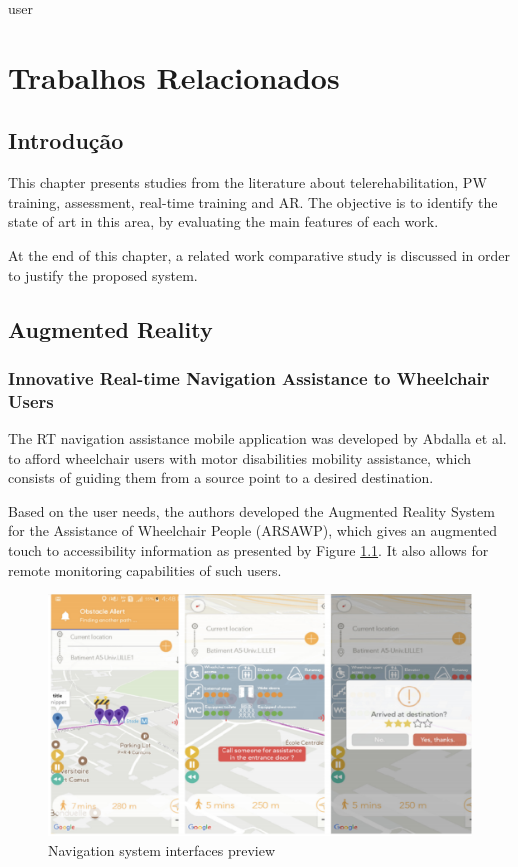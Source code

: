 user\chapter{Trabalhos Relacionados}

\section{Introdução}

This chapter presents studies from the literature about telerehabilitation, PW training, assessment, real-time training and AR. The objective is to identify the state of art in this area, by evaluating the main features of each work.

At the end of this chapter, a related work comparative study is discussed in order to justify the proposed system.

\section{Augmented Reality}
\subsection{Innovative Real-time Navigation Assistance to Wheelchair Users}
The  RT navigation assistance mobile application was developed by Abdalla et al. \cite{abdallah2019} to afford wheelchair users with motor disabilities mobility assistance, which consists of guiding them from a source point to a desired destination. 

Based on the user needs, the authors developed the Augmented Reality System for the Assistance of Wheelchair People (ARSAWP), which gives an augmented touch to accessibility information as presented by Figure \ref{fig:abdallah2019}. It also allows for remote monitoring capabilities of such users. 

\begin{figure}[!hbt]
\begin{center}
\includegraphics[width=0.9 \textwidth]{img/cap3/abdallah2019}
\caption{Navigation system interfaces preview \cite{abdallah2019}}
\label{fig:abdallah2019}
\end{center}
\end{figure}


